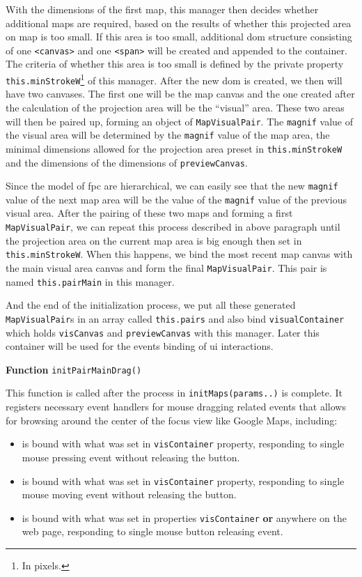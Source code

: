 With the dimensions of the first \gls{map}, this manager then decides whether additional \glspl{map} are required, based on the results of whether this projected area on \gls{map} is too small. If this area is too small, additional \gls{dom} structure consisting of one \texttt{<canvas>} and one \texttt{<span>} will be created and appended to the container. The criteria of whether this area is too small is defined by the private property \texttt{this.minStrokeW}\footnote{ In pixels.} of this manager. After the new \gls{dom} is created, we then will have two canvases. The first one will be the \gls{map} canvas and the one created after the calculation of the projection area will be the ``visual'' area. These two areas will then be paired up, forming an object of \texttt{MapVisualPair}. The \texttt{magnif} value of the visual area will be determined by the \texttt{magnif} value of the \gls{map} area, the minimal dimensions allowed for the projection area preset in \texttt{this.minStrokeW} and the dimensions of the dimensions of \texttt{previewCanvas}.

Since the model of \gls{fpc} are hierarchical, we can easily see that the new \texttt{magnif} value of the next \gls{map} area will be the value of the \texttt{magnif} value of the previous visual area. After the pairing of these two \glspl{map} and forming a first \texttt{MapVisualPair}, we can repeat this process described in above paragraph until the projection area on the current \gls{map} area is big enough then set in \texttt{this.minStrokeW}. When this happens, we bind the most recent \gls{map} canvas with the main visual area canvas and form the final \texttt{MapVisualPair}. This pair is named \texttt{this.pairMain} in this manager.

And the end of the initialization process, we put all these generated \texttt{MapVisualPair}s in an array called \texttt{this.pairs} and also bind \texttt{visualContainer} which holds \texttt{visCanvas} and \texttt{previewCanvas} with this manager. Later this container will be used for the events binding of \gls{ui} interactions.

\textbf{Function} \verb|initPairMainDrag()|

This function is called after the process in \texttt{initMaps(params..)} is complete. It registers necessary event handlers for mouse dragging related events that allows for browsing around the center of the focus view like Google Maps, including:

\begin{itemize}
  \item {} is bound with what was set in \texttt{visContainer} property, responding to single mouse pressing event without releasing the button.
  \item {} is bound with what was set in \texttt{visContainer} property, responding to single mouse moving event without releasing the button.
  \item {} is bound with what was set in properties \texttt{visContainer} \textbf{or} anywhere on the web page, responding to single mouse button releasing event.
\end{itemize}


